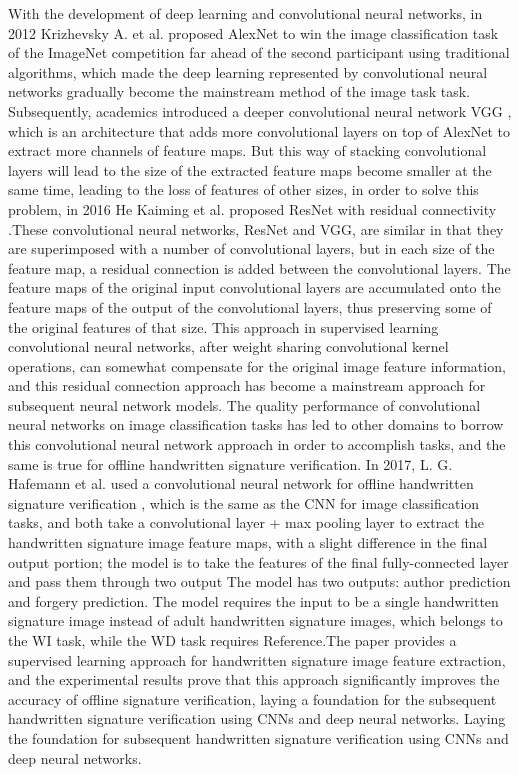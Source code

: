 \documentclass{article}
\begin{document}
With the development of deep learning and convolutional neural networks, in 2012 Krizhevsky A. et al. proposed AlexNet \cite{8} to win the image classification task of the ImageNet competition far ahead of the second participant using traditional algorithms, which made the deep learning represented by convolutional neural networks gradually become the mainstream method of the image task task. Subsequently, academics introduced a deeper convolutional neural network VGG \cite{9}, which is an architecture that adds more convolutional layers on top of AlexNet to extract more channels of feature maps. But this way of stacking convolutional layers will lead to the size of the extracted feature maps become smaller at the same time, leading to the loss of features of other sizes, in order to solve this problem, in 2016 He Kaiming et al. proposed ResNet with residual connectivity \cite{10}.These convolutional neural networks, ResNet and VGG, are similar in that they are superimposed with a number of convolutional layers, but in each size of the feature map, a residual connection is added between the convolutional layers. The feature maps of the original input convolutional layers are accumulated onto the feature maps of the output of the convolutional layers, thus preserving some of the original features of that size. This approach in supervised learning convolutional neural networks, after weight sharing convolutional kernel operations, can somewhat compensate for the original image feature information, and this residual connection approach has become a mainstream approach for subsequent neural network models. The quality performance of convolutional neural networks on image classification tasks has led to other domains to borrow this convolutional neural network approach in order to accomplish tasks, and the same is true for offline handwritten signature verification. In 2017, L. G. Hafemann et al. used a convolutional neural network for offline handwritten signature verification \cite{11}, which is the same as the CNN for image classification tasks, and both take a convolutional layer + max pooling layer to extract the handwritten signature image feature maps, with a slight difference in the final output portion; the model is to take the features of the final fully-connected layer and pass them through two output The model has two outputs: author prediction and forgery prediction. The model requires the input to be a single handwritten signature image instead of adult handwritten signature images, which belongs to the WI task, while the WD task requires Reference.The paper provides a supervised learning approach for handwritten signature image feature extraction, and the experimental results prove that this approach significantly improves the accuracy of offline signature verification, laying a foundation for the subsequent handwritten signature verification using CNNs and deep neural networks. Laying the foundation for subsequent handwritten signature verification using CNNs and deep neural networks.
\end{document}
